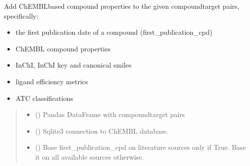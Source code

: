 \documentclass[letterpaper,10pt,english]{sphinxmanual}
\begin{document}
\begin{fulllineitems}
\label{\detokenize{add_chembl_compound_properties:add_chembl_compound_properties.add_all_chembl_compound_properties}}
\pysigstartsignatures
{}
\pysigstopsignatures
\sphinxAtStartPar
Add ChEMBL\sphinxhyphen{}based compound properties to the given compound\sphinxhyphen{}target pairs, specifically:
\begin{itemize}
\item {} 
\sphinxAtStartPar
the first publication date of a compound (first\_publication\_cpd)

\item {} 
\sphinxAtStartPar
ChEMBL compound properties

\item {} 
\sphinxAtStartPar
InChI, InChI key and canonical smiles

\item {} 
\sphinxAtStartPar
ligand efficiency metrics

\item {} 
\sphinxAtStartPar
ATC classifications

\end{itemize}
\begin{quote}\begin{description}
\begin{itemize}
\item {} 
\sphinxAtStartPar
{} () \textendash{} Pandas DataFrame with compound\sphinxhyphen{}target pairs

\item {} 
\sphinxAtStartPar
{} () \textendash{} Sqlite3 connection to ChEMBL database.

\item {} 
\sphinxAtStartPar
{} () \textendash{} Base first\_publication\_cpd on literature sources only if True.
Base it on all available sources otherwise.


\end{itemize}
\end{description}
\end{quote}
\end{fulllineitems}
\end{document}

